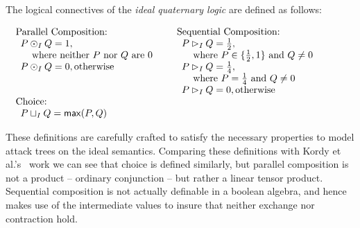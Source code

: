 \documentclass{llncs}
\begin{document}
\begin{definition}
  \label{def:ideal-semantics}
  The logical connectives of the \emph{ideal quaternary logic} are
  defined as follows:\vspace{-5px}
  \begin{center}
    \begin{math}
      \setlength{\arraycolsep}{5px}
      \begin{array}{lll}
        \begin{array}{lll}
          \text{Parallel Composition:}\\
          \begin{array}{lll}
            P \odot_I Q = 1,\\
            \,\,\,\,\,\,\,\text{where neither $P$ nor $Q$ are $0$}\\
            P \odot_I Q = 0, \text{otherwise}\\\\\\
          \end{array}
        \end{array}
        &
        \begin{array}{lll}
          \text{Sequential Composition:}\\
          \begin{array}{lll}          
            P \rhd_I Q = \half,\\
            \,\,\,\,\,\,\,\text{where } P \in \{\half, 1\} \text{ and } Q \neq 0\\            
            P \rhd_I Q = \forth,\\
            \,\,\,\,\,\,\,\text{where } P = \forth \text{ and } Q \neq 0\\
            P \rhd_I Q = 0, \text{otherwise}\\
          \end{array}
        \end{array}
        \\[30px]
        \begin{array}{lll}
          \text{Choice:}\\    
          \begin{array}{lll}
            P \sqcup_I Q = \mathsf{max}(P,Q)
          \end{array}
        \end{array}
      \end{array}
    \end{math}
  \end{center}        
\end{definition}
These definitions are carefully crafted to satisfy the necessary
properties to model attack trees on the ideal semantics.  Comparing
these definitions with Kordy et al.'s~\cite{Kordy:2012} work we can
see that choice is defined similarly, but parallel composition is not
a product -- ordinary conjunction -- but rather a linear tensor
product. Sequential composition is not actually definable in a boolean
algebra, and hence makes use of the intermediate values to insure that
neither exchange nor contraction hold.
\end{document}
